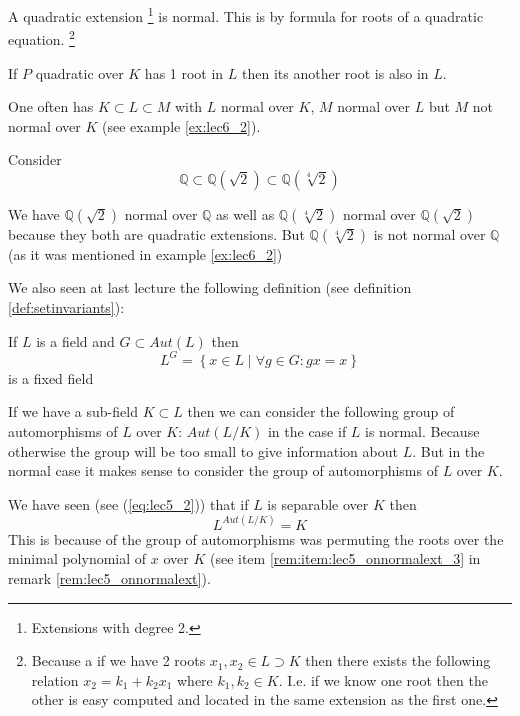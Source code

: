 \begin{remark}
  A quadratic extension
  \footnote {
    Extensions with degree 2. 
  }
  is normal. This is by formula for roots of a
  quadratic equation.
  \footnote {
    Because a if we have 2 roots $x_1, x_2 \in L \supset K$ then there
    exists the following relation $x_2 = k_1 + k_2 x_1$ where $k_1,
    k_2 \in K$. I.e. if we know one root then the other is easy
    computed and located in the same extension as the first one. 
  }

  If $P$ quadratic over $K$ has 1 root in $L$ then its another root is
  also in $L$.
\end{remark}

\begin{remark}
  One often has $K \subset L \subset M$ with $L$ normal over $K$, $M$
  normal over $L$ but $M$ not normal over $K$ (see example
  \ref{ex:lec6_2}). 
\end{remark}

\begin{example}
  Consider
  \[
  \mathbb{Q} \subset
  \mathbb{Q}\left(\sqrt{2}\right)
  \subset
  \mathbb{Q}\left(\sqrt[4]{2}\right)
  \]

  We have $\mathbb{Q}\left(\sqrt{2}\right)$ normal over $\mathbb{Q}$
  as well as $\mathbb{Q}\left(\sqrt[4]{2}\right)$ normal over
  $\mathbb{Q}\left(\sqrt{2}\right)$ because they both are quadratic
  extensions. But 
  $\mathbb{Q}\left(\sqrt[4]{2}\right)$ is not normal over $\mathbb{Q}$
  (as it was mentioned in example \ref{ex:lec6_2})
  \label{ex:lec6_2}
\end{example}

We also seen at last lecture the following definition
(see definition \ref{def:setinvariants}):
\begin{definition}
  If $L$ is a field and $G \subset Aut\left(L\right)$ then
  \[
  L^G = \left\{
  x \in L \mid \forall g \in G: g x = x 
  \right\}
  \]  
  is a fixed field
  \label{def:fixedfield}
\end{definition}

If we have a sub-field $K \subset L$ then we can consider the
following group of automorphisms of $L$ over $K$:
$Aut\left(L/K\right)$ in the case if $L$ is normal.
Because otherwise the group will be too small to give information
about $L$. But in the normal case it makes sense to consider  
the group of automorphisms of $L$ over $K$.

We have seen (see (\ref{eq:lec5_2})) that if $L$ is separable over $K$
then 
\[
L^{Aut\left(L/K\right)} = K
\]
This is because of the group of automorphisms was permuting the roots
over the minimal polynomial of $x$ over $K$ (see item
\ref{rem:item:lec5_onnormalext_3} in remark
\ref{rem:lec5_onnormalext}). 

